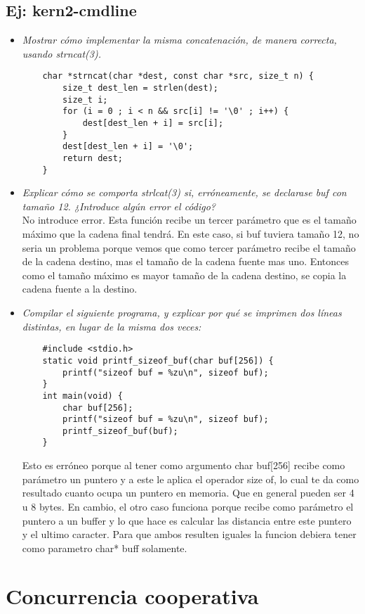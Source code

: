 \documentclass[a4paper, 12pt]{article}
\begin{document}
		\subsection{Ej: kern2-cmdline}
		\begin{itemize}
			\item \textit{Mostrar cómo implementar la misma concatenación, de
			manera correcta, usando strncat(3).}
\begin{lstlisting}
	char *strncat(char *dest, const char *src, size_t n) {
		size_t dest_len = strlen(dest);
		size_t i;
		for (i = 0 ; i < n && src[i] != '\0' ; i++) {
			dest[dest_len + i] = src[i];
		}
		dest[dest_len + i] = '\0';
		return dest;
	}
\end{lstlisting}
			\item \textit{Explicar cómo se comporta strlcat(3) si, erróneamente,
			se declarase buf con tamaño 12. ¿Introduce algún error el código?\\}
			No introduce error. Esta función recibe un tercer parámetro que es
			el tamaño máximo que la cadena final tendrá. En este caso, si buf
			tuviera tamaño 12, no seria un problema porque vemos que como tercer
			parámetro recibe el tamaño de la cadena destino, mas el tamaño de la
			cadena fuente mas uno. Entonces como el tamaño máximo es mayor
			tamaño de la cadena destino, se copia la cadena fuente a la destino.
			\item \textit{Compilar el siguiente programa, y explicar por qué se
			imprimen dos líneas distintas, en lugar de la misma dos veces:\\}
\begin{lstlisting}
	#include <stdio.h>
	static void printf_sizeof_buf(char buf[256]) {
		printf("sizeof buf = %zu\n", sizeof buf);
	}
	int main(void) {
		char buf[256];
		printf("sizeof buf = %zu\n", sizeof buf);
		printf_sizeof_buf(buf);
	}
\end{lstlisting}
			Esto es erróneo porque al tener como argumento char buf[256]
			recibe como parámetro un puntero y a este le aplica el operador
			size of, lo cual te da como resultado cuanto ocupa un puntero en
			memoria. Que en general pueden ser 4 u 8 bytes. En cambio, el otro
			caso funciona porque recibe como parámetro el puntero a un buffer y
			lo que hace es calcular las distancia entre este puntero y el
			ultimo caracter. Para que ambos resulten iguales la funcion
			debiera tener como parametro char* buff solamente.
		\end{itemize}
	\section{Concurrencia cooperativa}
\end{document}
